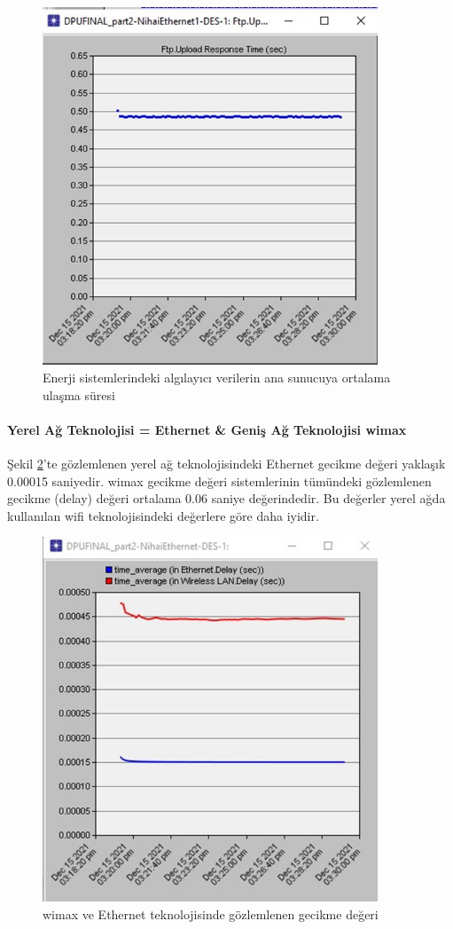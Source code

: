 \begin{figure}[htbp]
\centerline{\includegraphics[width=10cm]{Resim/Sekil4-33.jpg}}
\caption{Enerji sistemlerindeki algılayıcı verilerin ana sunucuya ortalama ulaşma süresi}
\label{fig:4-34}
\end{figure}


\paragraph{Yerel Ağ Teknolojisi = Ethernet \& Geniş Ağ Teknolojisi \gls{wimax}}

Şekil \ref{fig:4-35}’te gözlemlenen yerel ağ teknolojisindeki Ethernet gecikme değeri yaklaşık 0.00015 saniyedir. \gls{wimax} gecikme değeri sistemlerinin tümündeki gözlemlenen gecikme (delay) değeri ortalama 0.06 saniye değerindedir. Bu değerler yerel ağda kullanılan \gls{wifi} teknolojisindeki değerlere göre daha iyidir.


\begin{figure}[htbp]
\centerline{\includegraphics[width=10cm]{Resim/Sekil4-34.jpg}}
\caption{\gls{wimax} ve Ethernet teknolojisinde gözlemlenen gecikme değeri}
\label{fig:4-35}
\end{figure}

